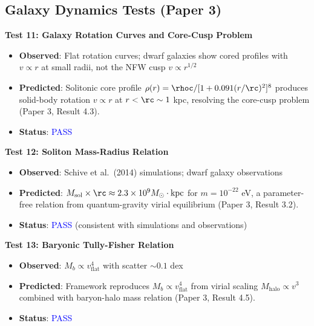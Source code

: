\documentclass[11pt,a4paper]{article}
\theoremstyle{definition}
\theoremstyle{remark}
\begin{document}
\subsection{Galaxy Dynamics Tests (Paper 3)}
\label{sec:tests_galactic}

\textbf{Test 11: Galaxy Rotation Curves and Core-Cusp Problem}

\begin{itemize}[leftmargin=*, itemsep=0.1em]
\item \textbf{Observed}: Flat rotation curves; dwarf galaxies show cored profiles with $v \propto r$ at small radii, not the NFW cusp $v \propto r^{1/2}$
\item \textbf{Predicted}: Solitonic core profile $\rho(r) = \rhoc/[1+0.091(r/\rc)^2]^8$ produces solid-body rotation $v \propto r$ at $r < \rc \sim 1$ kpc, resolving the core-cusp problem (Paper 3, Result 4.3).
\item \textbf{Status}: \textcolor{blue}{PASS}
\end{itemize}

\textbf{Test 12: Soliton Mass-Radius Relation}

\begin{itemize}[leftmargin=*, itemsep=0.1em]
\item \textbf{Observed}: Schive et al.\ (2014) simulations; dwarf galaxy observations
\item \textbf{Predicted}: $M_{\mathrm{sol}} \times \rc \approx 2.3 \times 10^9 M_\odot \cdot \mathrm{kpc}$ for $m = 10^{-22}$ eV, a parameter-free relation from quantum-gravity virial equilibrium (Paper 3, Result 3.2).
\item \textbf{Status}: \textcolor{blue}{PASS} (consistent with simulations and observations)
\end{itemize}

\textbf{Test 13: Baryonic Tully-Fisher Relation}

\begin{itemize}[leftmargin=*, itemsep=0.1em]
\item \textbf{Observed}: $M_b \propto v_{\mathrm{flat}}^4$ with scatter $\sim 0.1$ dex \cite{McGaugh2000}
\item \textbf{Predicted}: Framework reproduces $M_b \propto v_{\mathrm{flat}}^4$ from virial scaling $M_{\mathrm{halo}} \propto v^3$ combined with baryon-halo mass relation (Paper 3, Result 4.5).
\item \textbf{Status}: \textcolor{blue}{PASS}
\end{itemize}
\end{document}
